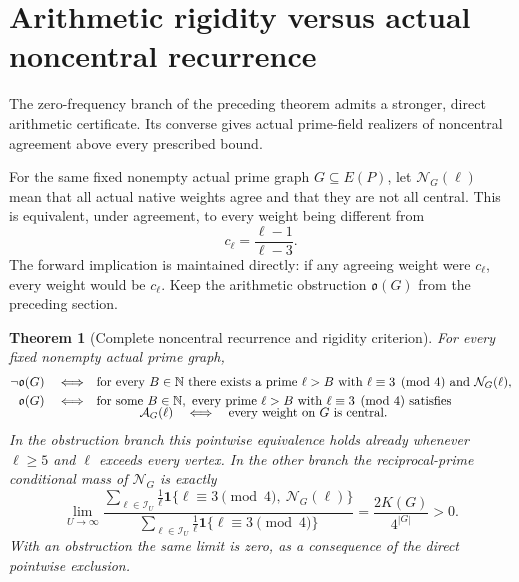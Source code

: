 \documentclass[11pt]{article}
\newtheorem{theorem}{Theorem}[section]
\begin{document}
\section{Arithmetic rigidity versus actual noncentral recurrence}
\label{sec:native-noncentral-recurrence}

The zero-frequency branch of the preceding theorem admits a stronger,
direct arithmetic certificate. Its converse gives actual prime-field
realizers of noncentral agreement above every prescribed bound.

For the same fixed nonempty actual prime graph \(G\subseteq E(P)\), let
\(\mathcal N_G(\ell)\) mean that all actual native weights agree and
that they are not all central. This is equivalent, under agreement, to
every weight being different from
\[
                            c_\ell=\frac{\ell-1}{\ell-3}.
\]
The forward implication is maintained directly: if any agreeing weight
were \(c_\ell\), every weight would be \(c_\ell\).
Keep the arithmetic obstruction \(\mathfrak o(G)\) from the preceding
section.

\begin{theorem}[Complete noncentral recurrence and rigidity criterion]
\label{thm:native-noncentral-recurrence}
For every fixed nonempty actual prime graph,
\begin{align}
 \neg\mathfrak o(G)
 \quad\Longleftrightarrow\quad&
 \text{for every }B\in\mathbb N\text{ there exists a prime }\ell>B
 \text{ with }\ell\equiv3\pmod4
 \text{ and }\mathcal N_G(\ell),                         \label{eq:native-noncentral-recurrence}\\
 \mathfrak o(G)
 \quad\Longleftrightarrow\quad&
 \text{for some }B\in\mathbb N,\text{ every prime }\ell>B
 \text{ with }\ell\equiv3\pmod4\text{ satisfies}\\[-2mm]
 &\hspace{12mm}
 \mathcal A_G(\ell)\quad\Longleftrightarrow\quad
             \text{every weight on }G\text{ is central}. \nonumber
\end{align}
In the obstruction branch this pointwise equivalence holds already
whenever \(\ell\geq5\) and \(\ell\) exceeds every vertex.
In the other branch the reciprocal-prime conditional mass of
\(\mathcal N_G\) is exactly
\begin{equation}\label{eq:native-noncentral-mass}
 \lim_{U\to\infty}
 \frac{\displaystyle\sum_{\ell\in\mathcal I_U}\frac1\ell
      \mathbf1\{\ell\equiv3\pmod4,\ \mathcal N_G(\ell)\}}
      {\displaystyle\sum_{\ell\in\mathcal I_U}\frac1\ell
      \mathbf1\{\ell\equiv3\pmod4\}}
                  =\frac{2K(G)}{4^{|G|}}>0.
\end{equation}
With an obstruction the same limit is zero, as a consequence of the
direct pointwise exclusion.
\end{theorem}
\end{document}
